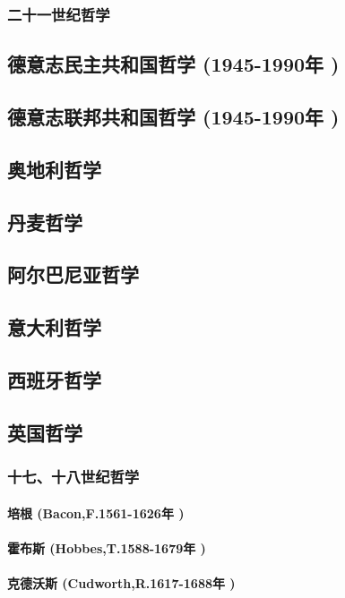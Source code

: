 \documentclass[UTF8]{../RepresentationUniverse}
\begin{document}
\subsubsection{二十一世纪哲学}



\subsection{德意志民主共和国哲学 (1945-1990年 )}
\subsection{德意志联邦共和国哲学 (1945-1990年 )}
\subsection{奥地利哲学}
\subsection{丹麦哲学}
\subsection{阿尔巴尼亚哲学}
\subsection{意大利哲学}
\subsection{西班牙哲学}


\subsection{英国哲学}
\subsubsection{十七、十八世纪哲学}
    \paragraph{培根 (Bacon,F.1561-1626年 )}
    \paragraph{霍布斯 (Hobbes,T.1588-1679年 )}
    \paragraph{克德沃斯 (Cudworth,R.1617-1688年 )}
\end{document}
